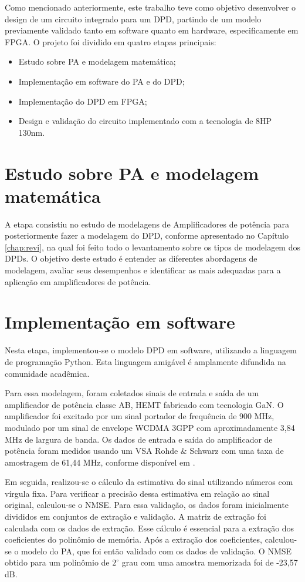 Como mencionado anteriormente, este trabalho teve como objetivo desenvolver o design de um circuito integrado para um DPD, partindo de um modelo previamente validado tanto em software quanto em hardware, especificamente em FPGA. O projeto foi dividido em quatro etapas principais:

\begin{itemize}
\item Estudo sobre PA e modelagem matemática;
\item Implementação em software do PA e do DPD;
\item Implementação do DPD em FPGA;
\item Design e validação do circuito implementado com a tecnologia de 8HP 130nm.
\end{itemize}


\section{Estudo sobre PA e modelagem matemática}
A etapa consistiu no estudo de modelagens de Amplificadores de potência para posteriormente fazer a modelagem do DPD, conforme apresentado no Capítulo \ref{chap:revi}, na qual foi feito todo o levantamento sobre os tipos de modelagem dos DPDs. O objetivo deste estudo é entender as diferentes abordagens de modelagem, avaliar seus desempenhos e identificar as mais adequadas para a aplicação em amplificadores de potência.

\section{Implementação em software} \label{sec:implsoft}

Nesta etapa, implementou-se o modelo DPD em software, utilizando a linguagem de programação Python. Esta linguagem amigável é amplamente difundida na comunidade acadêmica.

Para essa modelagem, foram coletados sinais de entrada e saída de um amplificador de potência classe AB, HEMT fabricado com tecnologia GaN. O amplificador foi excitado por um sinal portador de frequência de 900 MHz, modulado por um sinal de envelope WCDMA 3GPP com aproximadamente 3,84 MHz de largura de banda. Os dados de entrada e saída do amplificador de potência foram medidos usando um VSA Rohde \& Schwarz com uma taxa de amostragem de 61,44 MHz, conforme disponível em \cite{Bonfim2016}.

Em seguida, realizou-se o cálculo da estimativa do sinal utilizando números com vírgula fixa. Para verificar a precisão dessa estimativa em relação ao sinal original, calculou-se o NMSE. Para essa validação, os dados foram inicialmente divididos em conjuntos de extração e validação. A matriz de extração foi calculada com os dados de extração. Esse cálculo é essencial para a extração dos coeficientes do polinômio de memória. Após a extração dos coeficientes, calculou-se o modelo do PA, que foi então validado com os dados de validação. O NMSE obtido para um polinômio de $2^\circ$ grau com uma amostra memorizada foi de -23,57 dB.

